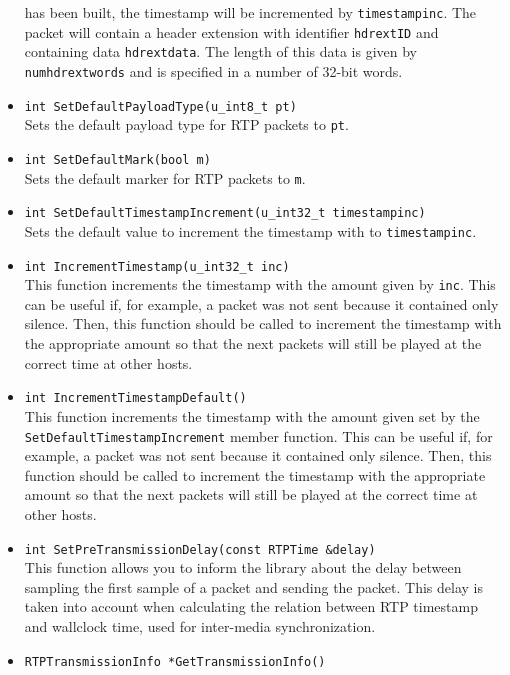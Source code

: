 \documentclass[12pt,a4paper]{article}
\begin{document}
\begin{itemize}
						has been built, the timestamp will be incremented by {\tt timestampinc}.
						The packet will contain a header extension with identifier {\tt hdrextID} and
						containing data {\tt hdrextdata}. The length of this data is given by
						{\tt numhdrextwords} and is specified in a number of 32-bit words.
					\item {\tt int SetDefaultPayloadType(u\_int8\_t pt)}\\
						Sets the default payload type for RTP packets to {\tt pt}.
					\item {\tt int SetDefaultMark(bool m)}\\
						Sets the default marker for RTP packets to {\tt m}.
					\item {\tt int SetDefaultTimestampIncrement(u\_int32\_t timestampinc)}\\
						Sets the default value to increment the timestamp with to
						{\tt timestampinc}.
					\item {\tt int IncrementTimestamp(u\_int32\_t inc)}\\
						This function increments the timestamp with the amount
						given by {\tt inc}. This can be useful if, for example,
						a packet was not sent because it contained only silence.
						Then, this function should be called to increment the
						timestamp with the appropriate amount so that the next
						packets will still be played at the correct time at
						other hosts.
					\item {\tt int IncrementTimestampDefault()}\\
						This function increments the timestamp with the amount
						given set by the {\tt SetDefaultTimestampIncrement}
						member function. This can be useful if, for example,
						a packet was not sent because it contained only silence.
						Then, this function should be called to increment the
						timestamp with the appropriate amount so that the next
						packets will still be played at the correct time at
						other hosts.						
					\item {\tt int SetPreTransmissionDelay(const RTPTime \&delay)}\\
						This function allows you to inform the library about the
						delay between sampling the first sample of a packet and
						sending the packet. This delay is taken into account when
						calculating the relation between RTP timestamp and wallclock
						time, used for inter-media synchronization.
					\item {\tt RTPTransmissionInfo *GetTransmissionInfo()}\\

\end{itemize}
\end{document}
